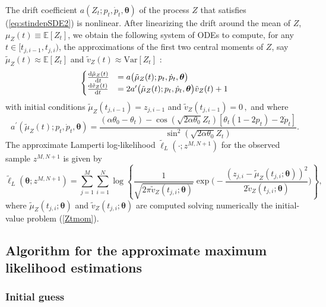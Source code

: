 \documentclass[11pt]{article}
\theoremstyle{definition}
\begin{document}
The drift coefficient $a(Z_t; p_t, \dot{p}_t, \bm{\theta}) $ of the process $Z$ that satisfies (\ref{eq:stindepSDE2}) is nonlinear. After linearizing the drift around the mean of $Z$, $\mu_Z(t) \equiv \mathbb{E}\left[Z_t\right]$,  we obtain the following system of ODEs to compute, for any $t\in [t_{j,i-1}, t_{j, i})$, the approximations of the first two central moments of $Z$, say  $\tilde{\mu}_Z(t) \approx \mathbb{E}\left[Z_t\right]$ and $\tilde{v}_Z(t) \approx \text{Var} \left[Z_t\right]$ :\\
\begin{equation}
\begin{cases}
\frac{\dif  \tilde{\mu}_Z (t)}{\dif t}&=  a\big( \tilde{\mu}_Z (t) ; p_t, \dot{p}_t, \bm{\theta} \big)   \\
\frac{\dif  \tilde{v}_Z (t)}{\dif t}&= 2  a^{\prime} \big( \tilde{\mu}_Z (t) ; p_t, \dot{p}_t, \bm{\theta} \big) \tilde{v}_Z (t) + 1
\end{cases}
\label{Ztmom}
\end{equation}
with initial conditions $\tilde{\mu}_Z(t_{j,i-1})= z_{j, i-1}$ and $\tilde{v}_Z(t_{j,i-1})= 0 \,,$ and where 
\begin{equation*}
a^{\prime} \left( \tilde{\mu}_Z (t) ; p_t, \dot{p}_t, \bm{\theta} \right) =    \frac{  (\alpha \theta_0 - \theta_t)  - \cos(\sqrt{2 \alpha \theta_0 } Z_t) [ \theta_t (1 - 2 p_t) - 2  \dot{p}_t ] }{\sin^2{(\sqrt{2 \alpha \theta_0} Z_t)}}.
\end{equation*}
The approximate Lamperti log-likelihood $\tilde{\ell}_L\left(\cdot ; z^{M, N+1}\right)$ for the observed sample $z^{M, N+1}$ is given by
\begin{equation}
\tilde{\ell}_L \left(\bm{\theta}; z^{M,N +1}\right) = \sum_{j=1}^M \sum_{i=1}^N \log \left\{ \frac{1}{\sqrt{2 \pi \tilde{v}_Z(t_{j,i}; \bm{\theta})}} \exp \Bigg( -\frac{(z_{j,i} - \tilde{\mu}_Z(t_{j,i};\bm{\theta} ))^2}{2 \tilde{v}_Z(t_{j,i}; \bm{\theta})} \Bigg) \right\},
\label{loglikelihoodZ}
\end{equation}
where $\tilde{\mu}_Z(t_{j,i};\bm{\theta} )$ and $\tilde{v}_Z(t_{j,i};\bm{\theta} )$ are computed solving numerically the initial-value problem (\ref{Ztmom}). 

\subsection{Algorithm for the approximate maximum likelihood estimations} \label{opt_sec}

\subsubsection{Initial guess}
\end{document}
